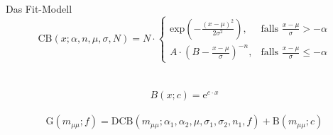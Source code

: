 \begin{frame}[t]{Das Fit-Modell}
  \begin{equation*}
    \text{CB}(x;\alpha ,n,\mu,\sigma,N)=N\cdot
      \begin{cases}
        \mathrm{exp}{\left(-\frac{(x-\mu)^{2}}{2\sigma^{2}}\right)}, &\text{falls }\frac{x-\mu}{\sigma}>-\alpha \\
        A\cdot\left(B-\frac{x-\mu}{\sigma}\right)^{-n}, &\text{falls }\frac{x-\mu}{\sigma }\leq -\alpha
      \end{cases}
  \end{equation*}
  \ \\
  \ \\
  \begin{equation*}
    B(x; c)= \mathrm{e}^{c\cdot x}
  \end{equation*}
  \ \\
  \begin{equation*}
    \mathrm{G}(m_{\mu\mu}; f)=\mathrm{DCB}(m_{\mu\mu};\alpha_1,\alpha_2,\mu,\sigma_1,\sigma_2,n_1,f) + \mathrm{B}(m_{\mu\mu};c)
  \end{equation*}
\end{frame}



